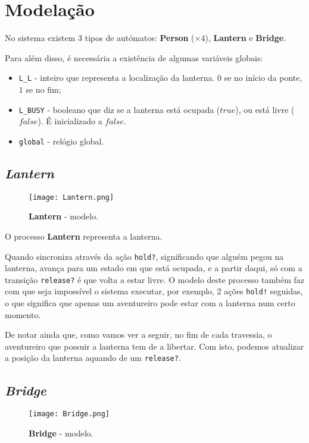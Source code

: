 \documentclass[12pt]{extarticle}
\begin{document}
\newpage
\section{Modelação}
No sistema existem 3 tipos de autómatos: \textbf{Person} ($\times 4$), \textbf{Lantern} e \textbf{Bridge}.

Para além disso, é necessária a existência de algumas variáveis globais:
\begin{itemize}
	\item \texttt{L\_L} - inteiro que representa a localização da lanterna. $0$ se no início da ponte, $1$ se no fim;
	\item \texttt{L\_BUSY} - booleano que diz se a lanterna está ocupada ($true$), ou está livre ($false$). É inicializado a $false$.
	\item \texttt{global} - relógio global. 
\end{itemize}


\subsection{\textit{Lantern}}
\begin{figure}[H]
	\centering
	\texttt{[image: Lantern.png]}
	\caption{\textbf{Lantern} - modelo.}
\end{figure}

O processo \textbf{Lantern} representa a lanterna.

Quando sincroniza através da ação \texttt{hold?}, significando que alguém pegou na lanterna, avança para um estado em que está ocupada, e a partir daqui, só com a transição \texttt{release?} é que volta a estar livre.
O modelo deste processo também faz com que seja impossível o sistema executar, por exemplo, 2 ações \texttt{hold!} seguidas, o que significa que apenas um aventureiro pode estar com a lanterna num certo momento.

De notar ainda que, como vamos ver a seguir, no fim de cada travessia, o aventureiro que possuir a lanterna tem de a libertar. Com isto, podemos atualizar a posição da lanterna aquando de um \texttt{release?}.


\subsection{\textit{Bridge}}
\begin{figure}[H]
	\centering
	\texttt{[image: Bridge.png]}
	\caption{\textbf{Bridge} - modelo.}
\end{figure}
\end{document}
